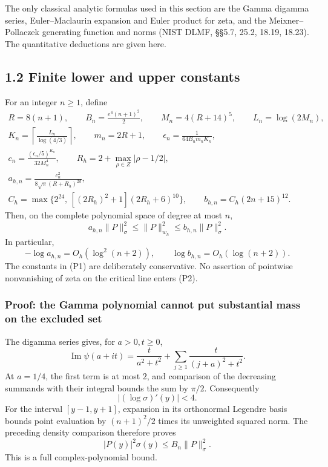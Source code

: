 \documentclass[11pt]{article}
\begin{document}
The only classical analytic formulas used in this section are the Gamma digamma series, Euler--Maclaurin expansion and Euler product for zeta, and the Meixner--Pollaczek generating function and norms (NIST DLMF, §§5.7, 25.2, 18.19, 18.23). The quantitative deductions are given here.

\subsection{1.2 Finite lower and upper constants}\label{finite-lower-and-upper-constants}

For an integer \(n\ge1\), define \[
\begin{gathered}
R=8(n+1),\qquad B_n=\frac{e^4(n+1)^2}{2},\qquad
M_n=4(R+14)^5,\qquad L_n=\log(2M_n),\\
K_n=\left\lceil\frac{L_n}{\log(4/3)}\right\rceil,\qquad m_n=2R+1,\qquad
\epsilon_n=\frac1{64B_nm_nK_n},\\
c_n=\frac{(\epsilon_n/5)^{K_n}}{32M_n^4},\qquad
R_h=2+\max_{\rho\in Z}|\rho-1/2|,\\
a_{h,n}=\frac{c_n^2}{8\sqrt\pi(R+R_h)^{2d}},\\
C_h=\max\{2^{24},\,[(2R_h)^2+1](2R_h+6)^{10}\},\qquad
b_{h,n}=C_h(2n+15)^{12}.
\end{gathered} \tag{P1}
\] Then, on the complete polynomial space of degree at most \(n\), \[
\boxed{
 a_{h,n}\|P\|_\sigma^2\le\|P\|_{w_h}^2
 \le b_{h,n}\|P\|_\sigma^2 .
} \tag{P2}
\] In particular, \[
-\log a_{h,n}=O_h(\log^2(n+2)),\qquad
\log b_{h,n}=O_h(\log(n+2)). \tag{P3}
\] The constants in (P1) are deliberately conservative. No assertion of pointwise nonvanishing of zeta on the critical line enters (P2).

\subsubsection{Proof: the Gamma polynomial cannot put substantial mass on the excluded set}\label{proof-the-gamma-polynomial-cannot-put-substantial-mass-on-the-excluded-set}

The digamma series gives, for \(a>0,t\ge0\), \[
\operatorname{Im}\psi(a+it)
=\frac{t}{a^2+t^2}+\sum_{j\ge1}\frac{t}{(j+a)^2+t^2}.
\] At \(a=1/4\), the first term is at most \(2\), and comparison of the decreasing summands with their integral bounds the sum by \(\pi/2\). Consequently \[
|(\log\sigma)'(y)|<4.
\] For the interval \([y-1,y+1]\), expansion in its orthonormal Legendre basis bounds point evaluation by \((n+1)^2/2\) times its unweighted squared norm. The preceding density comparison therefore proves \[
 |P(y)|^2\sigma(y)\le B_n\|P\|_\sigma^2. \tag{P4}
\] This is a full complex-polynomial bound.
\end{document}
